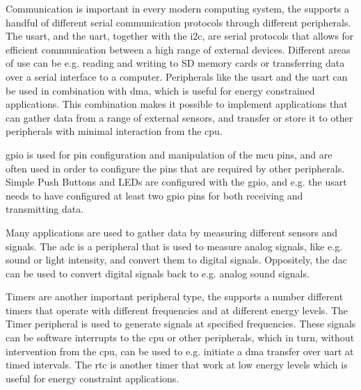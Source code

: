 Communication is important in every modern computing system, the {\gecko} supports a handful of different serial communication protocols through different peripherals.
The \gls{usart}, and the \gls{uart}, together with the \gls{i2c}, are serial protocols that allows for efficient communication between a high range of external devices.
Different areas of use can be e.g. reading and writing to SD memory cards or transferring data over a serial interface to a computer.
Peripherals like the \gls{usart} and the \gls{uart} can be used in combination with \gls{dma}, which is useful for energy constrained applications.
This combination makes it possible to implement applications that can gather data from a range of external sensors, and transfer or store it to other peripherals with minimal interaction from the \gls{cpu}.

\gls{gpio} is used for pin configuration and manipulation of the \gls{mcu} pins, and are often used in order to configure the pins that are required by other peripherals.
Simple Push Buttons and LEDs are configured with the \gls{gpio}, and e.g. the \gls{usart} needs to have configured at least two \gls{gpio} pins for both receiving and transmitting data.

Many applications are used to gather data by measuring different sensors and signals.
The \gls{adc} is a peripheral that is used to measure analog signals, like e.g. sound or light intensity, and convert them to digital signals.
Oppositely, the \gls{dac} can be used to convert digital signals back to e.g. analog sound signals.

Timers are another important peripheral type, the {\gecko} supports a number different timers that operate with different frequencies and at different energy levels.
The Timer peripheral is used to generate signals at specified frequencies.
These signals can be software interrupts to the \gls{cpu} or other peripherals, which in turn, without intervention from the \gls{cpu}, can be used to e.g. initiate a \gls{dma} transfer over \gls{uart} at timed intervals.
The \gls{rtc} is another timer that work at low energy levels which is useful for energy constraint applications.
